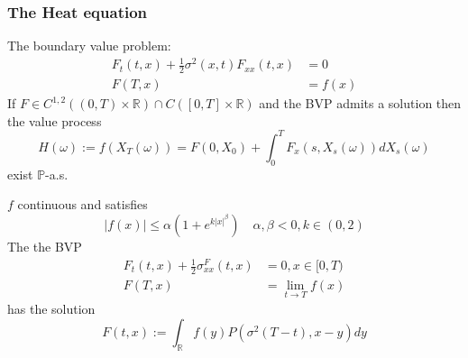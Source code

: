 \subsubsection*{The Heat equation}
\begin{lemma}
	The boundary value problem:
	\begin{align}
		F_t(t, x) + \frac{1}{2} \sigma^2(x, t) F_{xx}(t, x) &= 0\\
		F(T, x) &= f(x)
	\end{align}
	If $F \in C^{1, 2}((0, T) \times \mathbb{R}) \cap C([0, T] \times \mathbb{R})$ and the BVP admits a solution then the value process
	\begin{equation*}
		H(\omega) := f(X_T(\omega)) = F(0, X_0) + \int_0^T F_x (s, X_s(\omega)) dX_s(\omega)
	\end{equation*}
	exist $\mathbb{P}$-a.s.
\end{lemma}

\begin{theorem}
	$f$ continuous and satisfies
	\begin{equation*}
		|f(x)| \leq \alpha ( 1 + e^{k|x|^\beta}) \quad \alpha , \beta < 0, k \in (0, 2)
	\end{equation*}
	The the BVP 
	\begin{align}
		F_t(t, x) + \frac{1}{2} \sigma^ F_{xx}(t, x) &= 0, x \in [0, T)\\
		F(T, x) &= \lim_{t \rightarrow T}f(x)
	\end{align}
	has the solution
	\begin{equation*}
		F(t,x) := \int_\mathbb{R} f(y) P(\sigma^2(T - t), x-y)dy
	\end{equation*}
\end{theorem}


